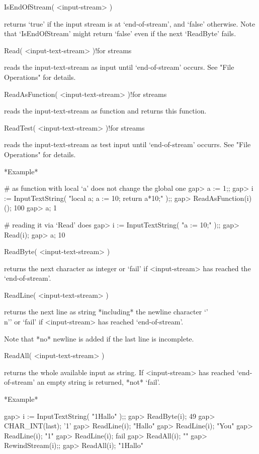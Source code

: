 
\>IsEndOfStream( <input-stream> )

returns `true' if  the input stream  is  at `end-of-stream', and  `false'
otherwise.  Note  that `IsEndOfStream' might return  `false' even  if the
next `ReadByte' fails.

\>Read( <input-text-stream> )!{for streams}

reads the input-text-stream as  input  until `end-of-stream' occurs.  See
"File Operations" for details.

\>ReadAsFunction( <input-text-stream> )!{for streams}

reads the input-text-stream as function and returns this function.

\>ReadTest( <input-text-stream> )!{for streams}

reads the input-text-stream as  test input until `end-of-stream' occurrs.
See "File Operations" for details.

*Example*

\beginexample
    # as function with local `a' does not change the global one
    gap> a := 1;;
    gap> i := InputTextString( "local a; a := 10; return a*10;" );;
    gap> ReadAsFunction(i)();
    100
    gap> a;
    1

    # reading it via `Read' does
    gap> i := InputTextString( "a := 10;" );;                      
    gap> Read(i);
    gap> a;
    10
\endexample

\>ReadByte( <input-text-stream> )

returns the  next character as  integer  or `fail'  if <input-stream> has
reached the `end-of-stream'.

\>ReadLine( <input-text-stream> )

returns  the   next line as   string  *including*  the  newline character
`{'\\n'}' or `fail' if <input-stream> has reached `end-of-stream'.

Note that *no* newline is added if the last line is incomplete.

\>ReadAll( <input-text-stream> )

returns   the  whole available input as    string.  If <input-stream> has
reached `end-of-stream' an empty string is returned, *not* `fail'.

*Example*

\beginexample
    gap> i := InputTextString( "1Hallo\nYou{}" );;
    gap> ReadByte(i);
    49
    gap> CHAR_INT(last);
    '1'
    gap> ReadLine(i);
    "Hallo\n"
    gap> ReadLine(i);
    "You\n"
    gap> ReadLine(i);
    "1"
    gap> ReadLine(i);
    fail
    gap> ReadAll(i);
    ""
    gap> RewindStream(i);;
    gap> ReadAll(i);     
    "1Hallo\nYou{}"
\endexample

